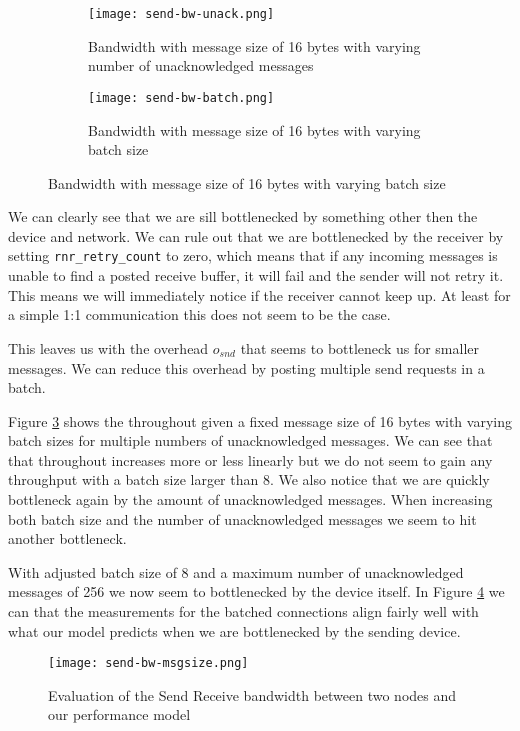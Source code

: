 \begin{figure}[h]
\begin{subfigure}[b]{0.49\textwidth}
  \centering
  \texttt{[image: send-bw-unack.png]}
  \caption{Bandwidth with message size of 16 bytes with varying number of unacknowledged messages}
  \label{fig:plot-sndrcv-bw-unack}
\end{subfigure}
\begin{subfigure}[b]{0.49\textwidth}
  \centering
  \texttt{[image: send-bw-batch.png]}
  \caption{Bandwidth with message size of 16 bytes with varying batch size }
  \label{fig:plot-sndrcv-bw-batch}
\end{subfigure}
\end{figure}



We can clearly see that we are sill bottlenecked by something other then the device and network. We can rule out that we are
bottlenecked by the receiver by setting \texttt{rnr\_retry\_count} to zero, which means that if any incoming messages is unable
to find a posted receive buffer, it will fail and the sender will not retry it. This means we will immediately notice if 
the receiver cannot keep up. At least for a simple 1:1 communication this does not seem to be the case.

This leaves us with the overhead $o_{snd}$ that seems to bottleneck us for smaller messages. We can reduce this overhead by 
posting multiple send requests in a batch. 

Figure \ref{fig:plot-sndrcv-bw-batch} shows the throughout given a fixed message size of 16 bytes with varying batch sizes for
multiple numbers of unacknowledged messages. We can see that that throughout increases more or less linearly but we do not seem
to gain any throughput with a batch size larger than 8. We also notice that we are quickly bottleneck again by the amount of 
unacknowledged messages. When increasing both batch size and the number of unacknowledged messages we seem to hit
another bottleneck.

With adjusted batch size of 8 and a maximum number of unacknowledged messages of 256 we now seem to bottlenecked by the 
device itself. In Figure \ref{fig:plot-sndrcv-bw} we can that the measurements for the batched connections align fairly 
well with what our model predicts when we are bottlenecked by the sending device. 

\begin{figure}[h]
\texttt{[image: send-bw-msgsize.png]}
\caption{Evaluation of the Send Receive bandwidth between two nodes and our performance model}
\label{fig:plot-sndrcv-bw}
\end{figure}
